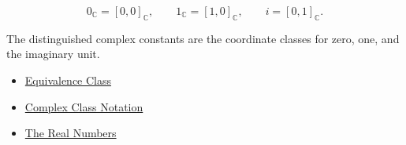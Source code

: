 
\begin{remark*}
\[
0_{\mathbb{C}}=[0,0]_{\mathbb{C}},
\qquad
1_{\mathbb{C}}=[1,0]_{\mathbb{C}},
\qquad
i=[0,1]_{\mathbb{C}}.
\]
\end{remark*}

\begin{remark*}[Interpretation]
The distinguished complex constants are the coordinate classes for zero, one,
and the imaginary unit.
\end{remark*}

\begin{dependencies}
\begin{itemize}
  \item \hyperref[def:equiv-class]{Equivalence Class}
  \item \hyperref[def:complex-class-notation]{Complex Class Notation}
  \item \hyperref[def:reals]{The Real Numbers}
\end{itemize}
\end{dependencies}

